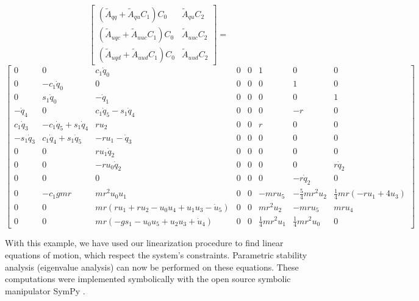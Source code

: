 \documentclass[smallcondensed]{svjour3}                     %
\begin{document}
\begin{equation*}
   \left[
     \begin{array}{cc}
       (\tilde{A}_{qq} + \tilde{A}_{qu} C_1 ) C_0 & \tilde{A}_{qu} C_2 \\
       (\tilde{A}_{uqc} + \tilde{A}_{uuc} C_1 ) C_0 & \tilde{A}_{uuc} C_2\\
       (\tilde{A}_{uqd} + \tilde{A}_{uud} C_1 ) C_0 & \tilde{A}_{uud} C_2
     \end{array}
   \right]=
\end{equation*}
\begin{equation}
\left[\begin{smallmatrix}0 & 0 & c_{1} \dot{q}_{0} & 0 & 0 & 1 & 0 & 0\\0 & - c_{1} \dot{q}_{0} & 0 & 0 & 0 & 0 & 1 & 0\\0 & s_{1} \dot{q}_{0} & - \dot{q}_{1} & 0 & 0 & 0 & 0 & 1\\- \dot{q}_{4} & 0 & c_{1} \dot{q}_{5} - s_{1} \dot{q}_{4} & 0 & 0 & 0 & - r & 0\\c_{1} \dot{q}_{3} & - c_{1} \dot{q}_{5} + s_{1} \dot{q}_{4} & r u_{2} & 0 & 0 & r & 0 & 0\\- s_{1} \dot{q}_{3} & c_{1} \dot{q}_{4} + s_{1} \dot{q}_{5} & - r u_{1} - \dot{q}_{3} & 0 & 0 & 0 & 0 & 0\\0 & 0 & r u_{1} \dot{q}_{2} & 0 & 0 & 0 & 0 & 0\\0 & 0 & - r u_{0} \dot{q}_{2} & 0 & 0 & 0 & 0 & r \dot{q}_{2}\\0 & 0 & 0 & 0 & 0 & 0 & - r \dot{q}_{2} & 0\\0 & - c_{1} g m r & m r^{2} u_{0} u_{1} & 0 & 0 & - m r u_{5} & - \frac{5}{4} m r^{2} u_{2} & \frac{1}{4} m r \left(- r u_{1} + 4 u_{3}\right)\\0 & 0 & m r \left(r u_{1} + r u_{2} - u_{0} u_{4} + u_{1} u_{3} - \dot{u}_{5}\right) & 0 & 0 & m r^{2} u_{2} & - m r u_{5} & m r u_{4}\\0 & 0 & m r \left(- g s_{1} - u_{0} u_{5} + u_{2} u_{3} + \dot{u}_{4}\right) & 0 & 0 & \frac{1}{4} m r^{2} u_{1} & \frac{1}{4} m r^{2} u_{0} & 0\end{smallmatrix}\right]
\end{equation}

With this example, we have used our linearization procedure to find linear
equations of motion, which respect the system's constraints. Parametric
stability analysis (eigenvalue analysis) can now be performed on these equations.
These computations were implemented symbolically with the open source symbolic
manipulator SymPy \cite{SymPy2012}.
\end{document}
